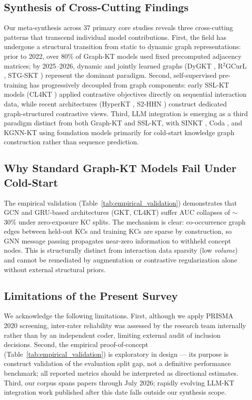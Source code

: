 ﻿\documentclass[10pt,journal,compsoc]{IEEEtran}
\begin{document}
\subsection{Synthesis of Cross-Cutting Findings}
Our meta-synthesis across 37 primary core studies reveals three cross-cutting patterns that transcend individual model contributions. First, the field has undergone a structural transition from static to dynamic graph representations: prior to 2022, over 80\% of Graph-KT models used fixed precomputed adjacency matrices; by 2025--2026, dynamic and jointly learned graphs (DyGKT \cite{KT038_DyGKT_2024}, R$^2$GCurL \cite{KT077_R2GCurL_2026}, STG-SKT \cite{KT079_STGSKT_2026}) represent the dominant paradigm. Second, self-supervised pre-training has progressively decoupled from graph components: early SSL-KT models (CL4KT \cite{KT039_CL4KT_2022}) applied contrastive objectives directly on sequential interaction data, while recent architectures (HyperKT \cite{KT066_HyperKT_2025}, S2-HHN \cite{KT042_S2HHN_2023}) construct dedicated graph-structured contrastive views. Third, LLM integration is emerging as a third paradigm distinct from both Graph-KT and SSL-KT, with SINKT \cite{KT044_SINKT_2024}, Coda \cite{KT070_Coda_2025}, and KGNN-KT \cite{KT076_KGNNKT_2025} using foundation models primarily for cold-start knowledge graph construction rather than sequence prediction.

\subsection{Why Standard Graph-KT Models Fail Under Cold-Start}
The empirical validation (Table~\ref{tab:empirical_validation}) demonstrates that GCN and GRU-based architectures (GKT, CL4KT) suffer AUC collapses of $\sim$30\% under zero-exposure KC splits. The mechanism is clear: co-occurrence graph edges between held-out KCs and training KCs are sparse by construction, so GNN message passing propagates near-zero information to withheld concept nodes. This is structurally distinct from interaction data sparsity (low \emph{volume}) and cannot be remediated by augmentation or contrastive regularization alone without external structural priors.

\subsection{Limitations of the Present Survey}
We acknowledge the following limitations. First, although we apply PRISMA 2020 screening, inter-rater reliability was assessed by the research team internally rather than by an independent coder, limiting external audit of inclusion decisions. Second, the empirical proof-of-concept (Table~\ref{tab:empirical_validation}) is exploratory in design --- its purpose is construct validation of the evaluation split gap, not a definitive performance benchmark; all reported metrics should be interpreted as directional estimates. Third, our corpus spans papers through July 2026; rapidly evolving LLM-KT integration work published after this date falls outside our synthesis scope.
\end{document}
